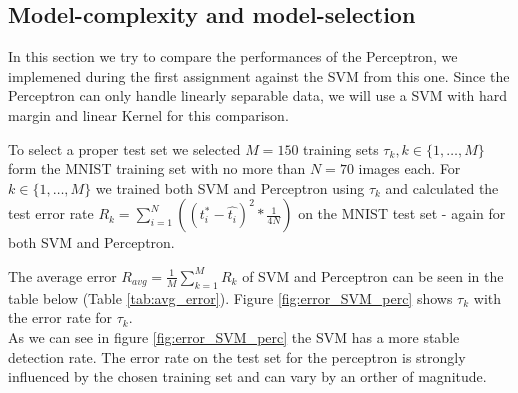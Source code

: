 \subsection{Model-complexity and model-selection}
In this section we try to compare the performances of the Perceptron, we implemened during the first assignment against the SVM from this one.
Since the Perceptron can only handle linearly separable data, we will use a SVM with hard margin and linear Kernel for this comparison.

To select a proper test set we selected $M = 150$ training sets $\tau _{k},k \in \{1,\ldots,M\}$ form the MNIST training set with no more than $N = 70$ images each.
For $k \in \{1,\ldots,M\}$ we trained both SVM and Perceptron using $\tau_k$ and calculated the test error rate $R_k = \sum_{i=1}^{N}( (t_{i}^{\ast} - \hat{t_{i}} )^2 * \frac{1}{4N} ) $ on the {MNIST} test set - again for both SVM and Perceptron.

The average error $R_{avg} = \frac{1}{M}\sum_{k=1}^M R_k$ of SVM and Perceptron can be seen in the table below (Table \ref{tab:avg_error}).
Figure \ref{fig:error_SVM_perc} shows $\tau_k$ with the error rate for $\tau_k$.\\
As we can see in figure \ref{fig:error_SVM_perc} the SVM has a more stable detection rate. The error rate on the test set for the perceptron is strongly influenced by the chosen training set and can vary by an orther of magnitude.


